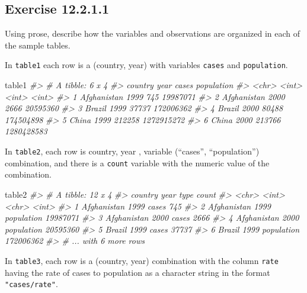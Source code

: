 \documentclass[]{book}
\newenvironment{Shaded}{\begin{snugshade}}{\end{snugshade}}
\newcommand{\CommentTok}[1]{\textcolor[rgb]{0.56,0.35,0.01}{\textit{#1}}}
\newcommand{\NormalTok}[1]{#1}
\theoremstyle{plain}
\theoremstyle{remark}
\begin{document}
\hypertarget{exercise-12.2.1.1}{%
\subsection*{\texorpdfstring{Exercise {12.2.1.1}}{Exercise 12.2.1.1}}\label{exercise-12.2.1.1}}

Using prose, describe how the variables and observations are organized in each of the sample tables.

In \texttt{table1} each row is a (country, year) with variables \texttt{cases} and \texttt{population}.

\begin{Shaded}
\begin{Highlighting}[]
\NormalTok{table1}
\CommentTok{#> # A tibble: 6 x 4}
\CommentTok{#>   country      year  cases population}
\CommentTok{#>   <chr>       <int>  <int>      <int>}
\CommentTok{#> 1 Afghanistan  1999    745   19987071}
\CommentTok{#> 2 Afghanistan  2000   2666   20595360}
\CommentTok{#> 3 Brazil       1999  37737  172006362}
\CommentTok{#> 4 Brazil       2000  80488  174504898}
\CommentTok{#> 5 China        1999 212258 1272915272}
\CommentTok{#> 6 China        2000 213766 1280428583}
\end{Highlighting}
\end{Shaded}

In \texttt{table2}, each row is country, year , variable (``cases'', ``population'') combination, and there is a \texttt{count} variable with the numeric value of the combination.

\begin{Shaded}
\begin{Highlighting}[]
\NormalTok{table2}
\CommentTok{#> # A tibble: 12 x 4}
\CommentTok{#>   country      year type           count}
\CommentTok{#>   <chr>       <int> <chr>          <int>}
\CommentTok{#> 1 Afghanistan  1999 cases            745}
\CommentTok{#> 2 Afghanistan  1999 population  19987071}
\CommentTok{#> 3 Afghanistan  2000 cases           2666}
\CommentTok{#> 4 Afghanistan  2000 population  20595360}
\CommentTok{#> 5 Brazil       1999 cases          37737}
\CommentTok{#> 6 Brazil       1999 population 172006362}
\CommentTok{#> # ... with 6 more rows}
\end{Highlighting}
\end{Shaded}

In \texttt{table3}, each row is a (country, year) combination with the column \texttt{rate} having the rate of cases to population as a character string in the format \texttt{"cases/rate"}.
\end{document}
